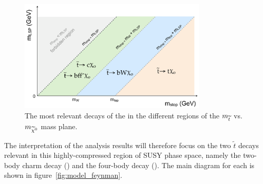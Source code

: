 \begin{figure}[h!]
  \centering
  \includegraphics[width=0.8\textwidth]{Figs/sms/stop_mass_plane.png}
  \caption{The most relevant decays of the \sTop in the different \deltam regions of
  the $m_{\widetilde{t}}$ vs. $m_{\widetilde{\chi}^{0}}$ mass plane.}
  \label{fig:stop_mass_plane}
\end{figure}

The interpretation of the analysis results will therefore focus on the two $\tilde{t}$
decays relevant in
this highly-compressed region of SUSY phase space, namely the two-body charm decay
(\Ttwocc) and the four-body decay (\Ttwodegen). The main diagram
for each is shown in figure~\ref{fig:model_feynman}.

